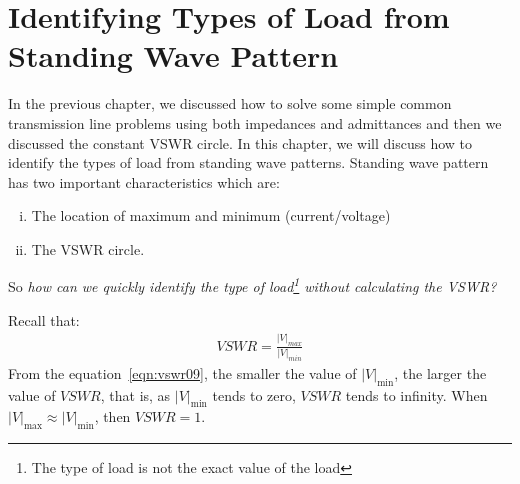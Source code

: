 \chapter{Identifying Types of Load from Standing Wave Pattern}\label{lec:lec9}

In the previous chapter, we discussed how to solve some simple common transmission line problems using both impedances and admittances and then we discussed the constant VSWR circle. In this chapter, we will discuss how to identify the types of load from standing wave patterns. Standing wave pattern has two important characteristics which are:
\begin{enumerate}[(i)]
\item The location of maximum and minimum (current/voltage)
\item The VSWR circle.
\end{enumerate}
So \emph{how can we quickly identify the type of load\footnote{The type of load is not the exact value of the load} without calculating the VSWR?}

Recall that:
\begin{align}
VSWR = \frac{|V|_{max}}{|V|_{min}}
\end{align}
From the equation~\eqref{eqn:vswr09}, the smaller the value of $|V|_\min$, the larger the value of ${VSWR}$, that is, as $|V|_\min$ tends to zero, ${VSWR}$ tends to infinity. When $|V|_\max{\approx}|V|_\min$, then $VSWR = 1$.


